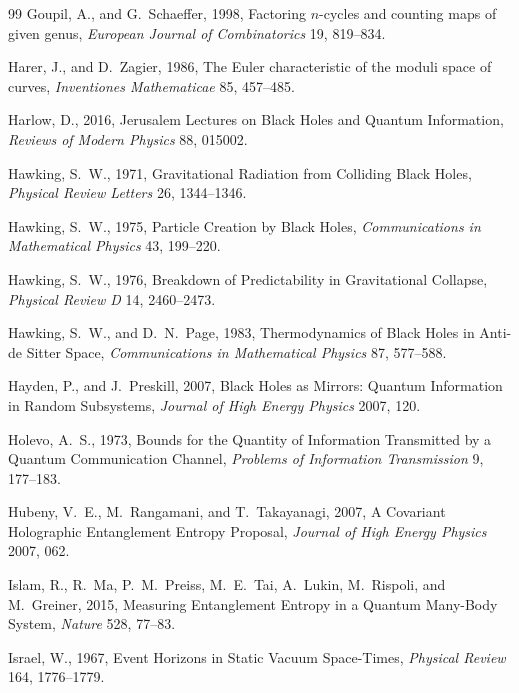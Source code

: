 \documentclass[11pt,letterpaper]{article}
\theoremstyle{plain}
\theoremstyle{definition}
\theoremstyle{remark}
\begin{document}
\begin{thebibliography}{99}
Goupil, A., and G.~Schaeffer, 1998, Factoring $n$-cycles and counting maps of given genus,
\textit{European Journal of Combinatorics} 19, 819--834.

Harer, J., and D.~Zagier, 1986, The Euler characteristic of the moduli space of curves, \textit{Inventiones Mathematicae} 85, 457--485.

Harlow, D., 2016, Jerusalem Lectures on Black Holes and Quantum Information, \textit{Reviews of Modern Physics} 88, 015002.

Hawking, S.~W., 1971, Gravitational Radiation from Colliding Black Holes, \textit{Physical Review Letters} 26, 1344--1346.

Hawking, S.~W., 1975, Particle Creation by Black Holes, \textit{Communications in Mathematical Physics} 43, 199--220.

Hawking, S.~W., 1976, Breakdown of Predictability in Gravitational Collapse, \textit{Physical Review D} 14, 2460--2473.

Hawking, S.~W., and D.~N.~Page, 1983, Thermodynamics of Black Holes in Anti-de Sitter Space, \textit{Communications in Mathematical Physics} 87, 577--588.

Hayden, P., and J.~Preskill, 2007, Black Holes as Mirrors: Quantum Information in Random Subsystems, \textit{Journal of High Energy Physics} 2007, 120.

Holevo, A.~S., 1973, Bounds for the Quantity of Information Transmitted by a
Quantum Communication Channel, \textit{Problems of Information Transmission}
9, 177--183.

Hubeny, V.~E., M.~Rangamani, and T.~Takayanagi, 2007, A Covariant Holographic Entanglement Entropy Proposal, \textit{Journal of High Energy Physics} 2007, 062.

Islam, R., R.~Ma, P.~M.~Preiss, M.~E.~Tai, A.~Lukin, M.~Rispoli, and M.~Greiner, 2015, Measuring Entanglement Entropy in a Quantum Many-Body System, \textit{Nature} 528, 77--83.

Israel, W., 1967, Event Horizons in Static Vacuum Space-Times, \textit{Physical Review} 164, 1776--1779.


\end{thebibliography}
\end{document}
